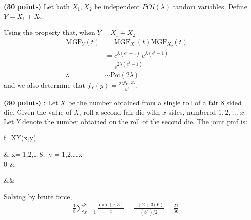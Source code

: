 \documentclass[12pt,letterpaper]{exam}
\begin{document}
\begin{questions}
	\question 
	\textbf{(30 points)}  Let both \(X_1, X_2\) be independent \(POI(\lambda)\) random variables. Define \(Y = X_1 + X_2\).
	
	
	\begin{solution}
		Using the property that, when \(Y=X_1+X_2\)
		\begin{align*}
			\text{MGF}_Y(t) 
			&= \text{MGF}_{X_1}(t) \text{MGF}_{X_2}(t) \\
			&= e^{\lambda(e^t-1)} \, e^{\lambda(e^t-1)} \\
			&= e^{2\lambda(e^t-1)} \\ 
			\therefore&\sim\text{Poi}(2\lambda)
		\end{align*}
		and we also determine that \(f_Y(y) = \frac{2\lambda^ye^{-2\lambda}}{y!}\).
		
	\end{solution}
	
	\question 
	\textbf{(30 points)} : Let \(X\) be the number obtained from a single roll of a fair 8 sided die.
	Given the value of \(X\), roll a second fair die with \(x\) sides, numbered \(1,2,\ldots,x\).
	Let \(Y\) denote the number obtained on the roll of the second die.
	The joint pmf is:
	\begin{flalign*} \qquad
		f_{XY}(x,y) = \begin{cases}
			 & x= 1,2,\ldots,8;\ y = 1,2,\ldots,x \\
			0 & 
		\end{cases} &&
	\end{flalign*}
	
	
	\begin{solution}
		Solving by brute force,
		\begin{align*}
			\frac{1}{8} \sum_{x=1}^{8} \frac{\min(x,3)}{x}
			= \frac{1+2+3(6)}{(8^2)/2}
			= \frac{21}{36}.
		\end{align*}
		
	\end{solution}
		

\end{questions}
\end{document}
